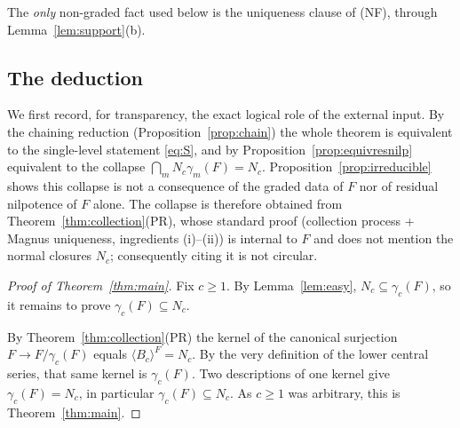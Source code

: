 \documentclass{amsart}
\theoremstyle{definition}
\theoremstyle{remark}
\begin{document}
\noindent The \emph{only} non-graded fact used below is the uniqueness clause of (NF), through
Lemma~\ref{lem:support}(b).

\subsection*{The deduction}

We first record, for transparency, the exact logical role of the external input. By the chaining
reduction (Proposition~\ref{prop:chain}) the whole theorem is equivalent to the single-level
statement \eqref{eq:S}, and by Proposition~\ref{prop:equivresnilp} equivalent to the collapse
$\bigcap_m N_c\gamma_m(F)=N_c$. Proposition~\ref{prop:irreducible} shows this collapse is not a
consequence of the graded data of $F$ nor of residual nilpotence of $F$ alone. The collapse is
therefore obtained from Theorem~\ref{thm:collection}(PR), whose standard proof
\textup{(}collection process + Magnus uniqueness, ingredients (i)--(ii)\textup{)} is internal to
$F$ and does not mention the normal closures $N_c$; consequently citing it is not circular.

\begin{proof}[Proof of Theorem~\ref{thm:main}]
Fix $c\ge1$. By Lemma~\ref{lem:easy}, $N_c\subseteq\gamma_c(F)$, so it remains to prove
$\gamma_c(F)\subseteq N_c$.

By Theorem~\ref{thm:collection}(PR) the kernel of the canonical surjection $F\to F/\gamma_c(F)$
equals $\langle B_c\rangle^{F}=N_c$. By the very definition of the lower central series, that same
kernel is $\gamma_c(F)$. Two descriptions of one kernel give $\gamma_c(F)=N_c$, in particular
$\gamma_c(F)\subseteq N_c$. As $c\ge1$ was arbitrary, this is Theorem~\ref{thm:main}.
\end{proof}
\end{document}
